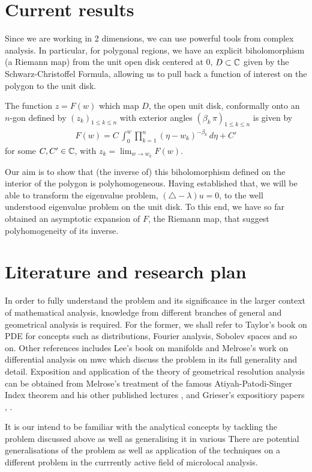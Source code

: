 \documentclass{article}
\begin{document}
\section{Current results} 
Since we are working in 2 dimensions, we can use powerful tools from complex analysis. In particular, for polygonal regions, we have an explicit biholomorphism (a Riemann map) from the unit open disk centered at 0, $D \subset \mathbb C$ given by the Schwarz-Christoffel Formula, allowing us to pull back a function of interest on the polygon to the unit disk. 
\begin{theorem}
The function $ z = F(w)$ which map $D$, the open unit disk, conformally onto an $n$-gon defined by  $(z_k)_{1 \leq k \leq n}$ with exterior angles $(\beta_k \, \pi)_{1 \leq k \leq n}$ is given by 
\begin{align} \label{eq: schwarz-christoffel formula}
F(w) = C \, \int_0^w \prod_{k = 1}^n (\eta - w_k)^{- \beta_k} \, d\eta + C'
\end{align}
for some $C, C' \in \mathbb C$, with $z_k = \lim_{w \to w_k} F(w)$. 
\end{theorem}
Our aim is to show that (the inverse of) this biholomorphism defined on the interior of the polygon is polyhomogeneous. Having established that, we will be able to transform the eigenvalue problem, $(\triangle - \lambda) u = 0$, to the well understood eigenvalue problem on the unit disk.  To this end, we have so far obtained an asymptotic expansion of $F$, the Riemann map, that suggest polyhomogeneity of its inverse. 

\section{Literature and research plan} 
In order to fully understand the problem and its significance in the larger context of mathematical analysis, knowledge from different branches of general and geometrical analysis is required. For the former, we shall refer to Taylor's book on PDE \cite{taylor_pde} for concepts such as distributions, Fourier analysis, Sobolev spaces and so on. Other references includes Lee's book on manifolds \cite{LeeSM} and Melrose's work on differential analysis on mwc \cite{rbm_daomwc} which discuss the problem in its full generality and detail. Exposition and application of the theory of geometrical resolution analysis can be obtained from Melrose's treatment of the famous Atiyah-Patodi-Singer Index theorem \cite{rbm_aps} and his other published lectures \cite{rbm_geo_analysis}, \cite{rbm_intro_microlocal} and Grieser's expositiory papers \cite{grieser_scales_blow_up}, \cite{grieser_b_calculus}. 

It is our intend to be familiar with the analytical concepts by tackling the problem discussed above as well as generalising it in various  There are potential generalisations of the problem as well as application of the techniques on a different problem in the currrently active field of microlocal analysis. 




\pagebreak 


\end{document}
